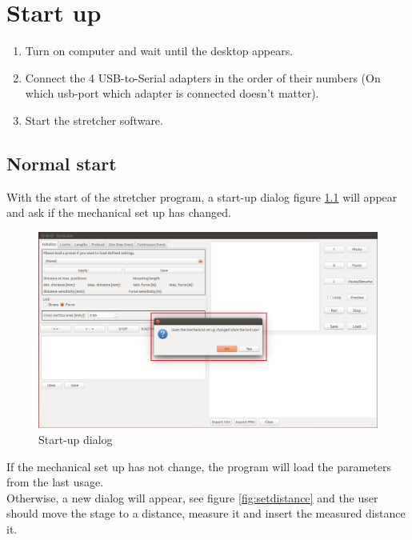 \chapter{Start up}

\begin{enumerate}
	\item Turn on computer and wait until the desktop appears.
	\item Connect the 4 USB-to-Serial adapters in the order of their numbers (On which usb-port which adapter is connected doesn't matter).
	\item Start the stretcher software.
\end{enumerate}

\section{Normal start}
\label{sec:normalstart}
With the start of the stretcher program, a start-up dialog figure \ref{fig:startup} will appear and ask if the mechanical set up has changed.

\begin{figure}[!ht]
	\centering
		\includegraphics[width=1.0\textwidth]{images/StartUp1}
	\caption{Start-up dialog}
	\label{fig:startup}
\end{figure}

If the mechanical set up has not change, the program will load the parameters from the last usage.
\\
Otherwise, a new dialog will appear, see figure \ref{fig:setdistance} and the user should move the stage to a distance, measure it and insert the measured distance it.

